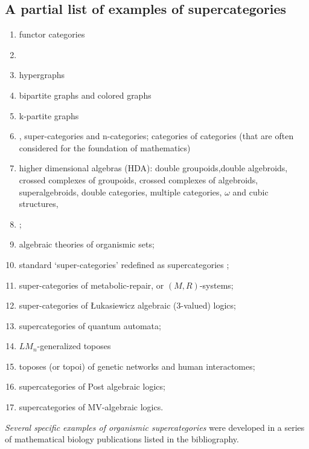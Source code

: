 \documentclass[12pt]{article}
\theoremstyle{plain}
\theoremstyle{definition}
\numberwithin{equation}{section}
\begin{document}
\subsection{A partial list of examples of supercategories}
\begin{enumerate}
\item functor categories
\item {}
\item hypergraphs
\item bipartite graphs and colored graphs
\item k-partite graphs
\item {}, super-categories and n-categories; categories of categories (that are often considered for the foundation of mathematics) 
\item higher dimensional algebras (HDA): double groupoids,double algebroids, crossed complexes of groupoids, crossed complexes of algebroids, superalgebroids, double categories, multiple categories, $\omega$ and cubic structures, 
\item {};
\item algebraic theories of organismic sets;
\item standard `super-categories' redefined as supercategories \cite{Urs2k7P};
\item super-categories of metabolic-repair, or $(M,R)$-systems;
\item super-categories of \L{}ukasiewicz algebraic (3-valued) logics;
\item supercategories of quantum automata;
\item $LM_n$-generalized toposes
\item toposes (or topoi) of genetic networks and human interactomes;
\item supercategories of Post algebraic logics;
\item supercategories of MV-algebraic logics.
\end{enumerate}

{\em Several specific examples of organismic supercategories} were developed in a series of mathematical biology publications listed in the bibliography. 
\end{document}
